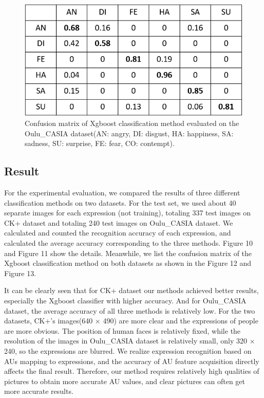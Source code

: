 \documentclass[10pt, conference, compsocconf]{IEEEtran}
\begin{document}
\begin{figure}[h]
	\centering
	\includegraphics[width=\linewidth]{ConfusionmatrixOULU}
	\caption{Confusion matrix of Xgboost classification method evaluated on the Oulu\_CASIA dataset(AN: angry, DI: disgust, HA: happiness, SA: sadness, SU: surprise, FE: fear, CO: contempt).}
\end{figure}

\subsection{Result}

For the experimental evaluation, we compared the results of three different classification methods on two datasets. For the test set, we used about 40 separate images for each expression (not training), totaling 337 test images on CK+ dataset and totaling 240 test images on Oulu\_CASIA dataset. We calculated and counted the recognition accuracy of each expression, and calculated the average accuracy corresponding to the three methods. Figure 10 and Figure 11 show the details. Meanwhile, we list the confusion matrix of the Xgboost classification method on both datasets as shown in the Figure 12 and Figure 13.

It can be clearly seen that for CK+ dataset our methods achieved better results, especially the Xgboost classifier with higher accuracy. And for Oulu\_CASIA dataset, the average accuracy of all three methods is relatively low. For the two datasets, CK+'s images(640 $\times$ 490) are more clear and the expressions of people are more obvious. The position of human faces is relatively fixed, while the resolution of the images in Oulu\_CASIA dataset is relatively small, only 320 $\times$ 240, so the expressions are blurred. We realize expression recognition based on AUs mapping to expressions, and the accuracy of AU feature acquisition directly affects the final result. Therefore, our method requires relatively high qualities of pictures to obtain more accurate AU values, and clear pictures can often get more accurate results.
\end{document}
